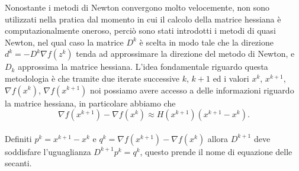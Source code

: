 \documentclass[a4paper, 12pt]{article}
\begin{document}
Nonostante i metodi di Newton convergono molto velocemente, non sono utilizzati nella pratica dal momento in cui il calcolo della matrice hessiana è computazionalmente oneroso, perciò sono stati introdotti i metodi di quasi Newton, nel qual caso la matrice $D^k$ è scelta in modo tale che la direzione $d^k = -D^k\nabla f(z^k)$ tenda ad approssimare la direzione del metodo di Newton, e $D_k$ approssima la matrice hessiana. L'idea fondamentale riguardo questa metodologia è che tramite due iterate successive $k$, $k+1$ ed i valori $x^k$, $x^{k+1}$, $\nabla f(x^k)$, $\nabla f(x^{k+1})$ noi possiamo avere accesso a delle informazioni riguardo la matrice hessiana, in particolare abbiamo che\\
\[\nabla f(x^{k+1}) - \nabla f(x^k) \approx H(x^{k+1})(x^{k+1} - x^k).\]\\
Definiti $p^k = x^{k+1} - x^k$ e $q^k = \nabla f(x^{k+1}) - \nabla f(x^k)$ allora $D^{k+1}$ deve soddisfare l'uguaglianza $D^{k+1} p^k = q^k$, questo prende il nome di equazione delle secanti.
\end{document}

